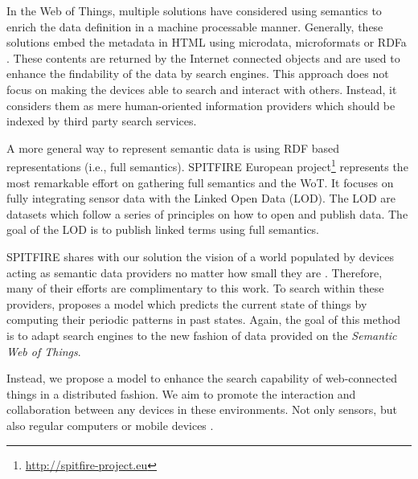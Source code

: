 
In the Web of Things, multiple solutions have considered using semantics to enrich the data definition in a machine processable manner.
Generally, these solutions embed the metadata in HTML using microdata, microformats or RDFa \citep{mayer_extensible_2011}.
These contents are returned by the Internet connected objects and are used to enhance the findability of the data by search engines.
This approach does not focus on making the devices able to search and interact with others.
Instead, it considers them as mere human-oriented information providers which should be indexed by third party search services.

A more general way to represent semantic data is using RDF based representations (i.e., full semantics).
SPITFIRE European project\footnote{\url{http://spitfire-project.eu}} represents the most remarkable effort on gathering full semantics and the WoT.
It focuses on fully integrating sensor data with the Linked Open Data (LOD). 
The LOD are datasets which follow a series of principles on how to open and publish data.
The goal of the LOD is to publish linked terms using full semantics.

SPITFIRE shares with our solution the vision of a world populated by devices acting as semantic data providers no matter how small they are \citep{hasemann_rdf_2012}.
Therefore, many of their efforts are complimentary to this work.
To search within these providers, \citet{pfisterer_spitfire:_2011} proposes a model which predicts the current state of things by computing their periodic patterns in past states.
Again, the goal of this method is to adapt search engines to the new fashion of data provided on the \emph{Semantic Web of Things}.

Instead, we propose a model to enhance the search capability of web-connected things in a distributed fashion.
We aim to promote the interaction and collaboration between any devices in these environments.
Not only sensors, but also regular computers or mobile devices \citep{balandin_access_2011}.